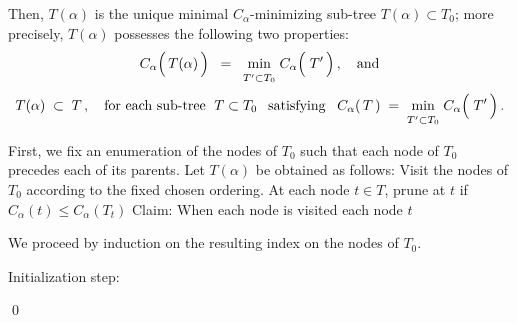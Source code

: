 \begin{proposition}
Then, $T(\alpha)$ is the unique
{\color{red}minimal $C_{\alpha}$-minimizing} sub-tree $T(\alpha) \subset T_{0}$;
more precisely, $T(\alpha)$ possesses the following two properties:
\begin{equation*}
C_{\alpha}\!\left(\,\overset{{\color{white}.}}{T}(\alpha)\,\right)
\;\; = \;\;
	\underset{T^{\prime} \overset{{\color{white}.}}{\subset} T_{0}}{\min}\;
	C_{\alpha}\!\left(\;\overset{{\color{white}.}}{T^{\prime}}\,\right),
\quad
\textnormal{and}
\end{equation*}
\begin{equation*}
T(\alpha) \; \subset \; T\,,
\quad
\textnormal{for each sub-tree \;$T \subset T_{0}$\;\, satisfying}\;\;\;
C_{\alpha}(\,T\,)
\; = \;
	\underset{T^{\prime} \overset{{\color{white}.}}{\subset} T_{0}}{\min}\;
	C_{\alpha}\!\left(\;\overset{{\color{white}.}}{T^{\prime}}\,\right).
\end{equation*}
\end{proposition}
\proof
First, we fix an enumeration of the nodes of $T_{0}$ such that
each node of $T_{0}$ precedes each of its parents.
Let $T(\alpha)$ be obtained as follows:
Visit the nodes of $T_{0}$ according to the fixed chosen ordering.
At each node $t \in T$, prune at $t$ if $C_{\alpha}(t) \leq C_{\alpha}(T_{t})$
Claim: When each node is visited each node $t$

We proceed by induction on the resulting index on the nodes of $T_{0}$.

Initialization step: 

\qed

